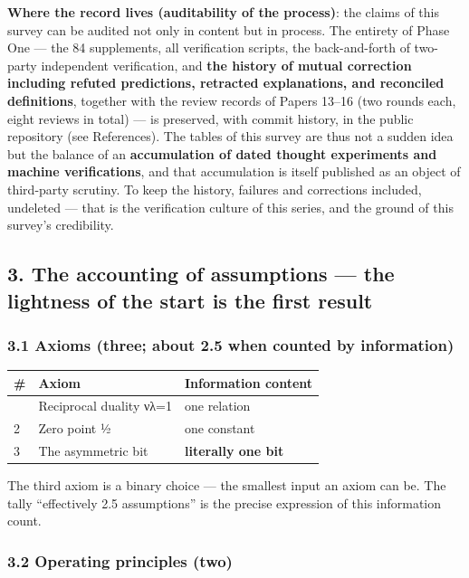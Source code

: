 \documentclass[
]{article}
\newcounter{none} %
\begin{document}
\textbf{Where the record lives (auditability of the process)}: the
claims of this survey can be audited not only in content but in process.
The entirety of Phase One --- the 84 supplements, all verification
scripts, the back-and-forth of two-party independent verification, and
\textbf{the history of mutual correction including refuted predictions,
retracted explanations, and reconciled definitions}, together with the
review records of Papers 13--16 (two rounds each, eight reviews in
total) --- is preserved, with commit history, in the public repository
(see References). The tables of this survey are thus not a sudden idea
but the balance of an \textbf{accumulation of dated thought experiments
and machine verifications}, and that accumulation is itself published as
an object of third-party scrutiny. To keep the history, failures and
corrections included, undeleted --- that is the verification culture of
this series, and the ground of this survey's credibility.

\subsection{3. The accounting of assumptions --- the lightness of the
start is the first
result}\label{the-accounting-of-assumptions-the-lightness-of-the-start-is-the-first-result}

\subsubsection{3.1 Axioms (three; about 2.5 when counted by
information)}\label{axioms-three-about-2.5-when-counted-by-information}

{\def\LTcaptype{none} %
\begin{longtable}[]{@{}lll@{}}
\toprule\noalign{}
\# & Axiom & Information content \\
\midrule\noalign{}
\endhead
\bottomrule\noalign{}
\endlastfoot
1 & Reciprocal duality νλ=1 & one relation \\
2 & Zero point ½ & one constant \\
3 & The asymmetric bit & \textbf{literally one bit} \\
\end{longtable}
}

The third axiom is a binary choice --- the smallest input an axiom can
be. The tally ``effectively 2.5 assumptions'' is the precise expression
of this information count.

\subsubsection{3.2 Operating principles
(two)}\label{operating-principles-two}
\end{document}
